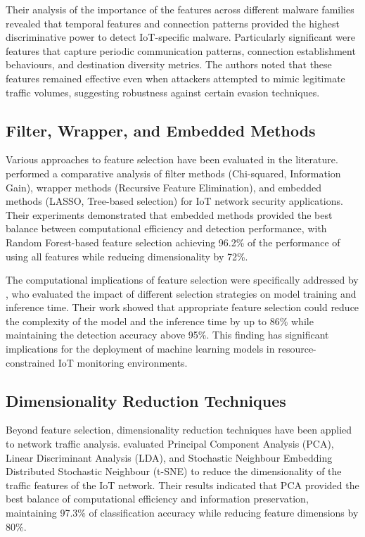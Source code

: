 Their analysis of the importance of the features across different malware families revealed that temporal features and connection patterns provided the highest discriminative power to detect IoT-specific malware. Particularly significant were features that capture periodic communication patterns, connection establishment behaviours, and destination diversity metrics. The authors noted that these features remained effective even when attackers attempted to mimic legitimate traffic volumes, suggesting robustness against certain evasion techniques.

\subsection{Filter, Wrapper, and Embedded Methods}

Various approaches to feature selection have been evaluated in the literature. \cite{Ngo2020} performed a comparative analysis of filter methods (Chi-squared, Information Gain), wrapper methods (Recursive Feature Elimination), and embedded methods (LASSO, Tree-based selection) for IoT network security applications. Their experiments demonstrated that embedded methods provided the best balance between computational efficiency and detection performance, with Random Forest-based feature selection achieving 96.2\% of the performance of using all features while reducing dimensionality by 72\%.

The computational implications of feature selection were specifically addressed by \cite{Hasan2019}, who evaluated the impact of different selection strategies on model training and inference time. Their work showed that appropriate feature selection could reduce the complexity of the model and the inference time by up to 86\% while maintaining the detection accuracy above 95\%. This finding has significant implications for the deployment of machine learning models in resource-constrained IoT monitoring environments.

\subsection{Dimensionality Reduction Techniques}

Beyond feature selection, dimensionality reduction techniques have been applied to network traffic analysis. \cite{Chadha2021} evaluated Principal Component Analysis (PCA), Linear Discriminant Analysis (LDA), and Stochastic Neighbour Embedding Distributed Stochastic Neighbour (t-SNE) to reduce the dimensionality of the traffic features of the IoT network. Their results indicated that PCA provided the best balance of computational efficiency and information preservation, maintaining 97.3\% of classification accuracy while reducing feature dimensions by 80\%.

